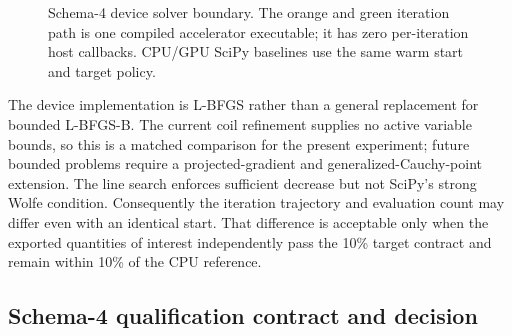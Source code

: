 \documentclass[11pt,a4paper]{article}
\newcommand{\code}[1]{\texttt{#1}}
\begin{document}
\begin{figure}[htbp]
\centering
{}
\caption{Schema-4 device solver boundary.  The orange and green iteration path
is one compiled accelerator executable; it has zero per-iteration host
callbacks.  CPU/GPU SciPy baselines use the same warm start and target policy.}
\label{fig:device-lbfgs-architecture}
\end{figure}

The device implementation is L-BFGS rather than a general replacement for
bounded L-BFGS-B.  The current coil refinement supplies no active variable
bounds, so this is a matched comparison for the present experiment; future
bounded problems require a projected-gradient and generalized-Cauchy-point
extension.  The line search enforces sufficient decrease but not SciPy's strong
Wolfe condition.  Consequently the iteration trajectory and evaluation count
may differ even with an identical start.  That difference is acceptable only
when the exported quantities of interest independently pass the 10\% target
contract and remain within 10\% of the CPU reference.

\subsection{Schema-4 qualification contract and decision}
\end{document}
